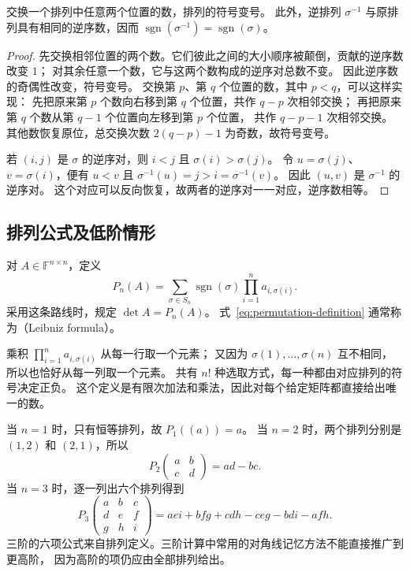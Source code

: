 \documentclass[UTF8,12pt,a4paper,fontset=fandol]{ctexart}
\begin{document}
\begin{lemma}[排列符号的两个事实]
\label{lem:permutation-sign}
交换一个排列中任意两个位置的数，排列的符号变号。
此外，逆排列 $\sigma^{-1}$ 与原排列具有相同的逆序数，因而
$\operatorname{sgn}(\sigma^{-1})=\operatorname{sgn}(\sigma)$。
\end{lemma}

\begin{proof}
先交换相邻位置的两个数。它们彼此之间的大小顺序被颠倒，贡献的逆序数改变 $1$；
对其余任意一个数，它与这两个数构成的逆序对总数不变。
因此逆序数的奇偶性改变，符号变号。
交换第 $p$、第 $q$ 个位置的数，其中 $p<q$，可以这样实现：
先把原来第 $p$ 个数向右移到第 $q$ 个位置，共作 $q-p$ 次相邻交换；
再把原来第 $q$ 个数从第 $q-1$ 个位置向左移到第 $p$ 个位置，
共作 $q-p-1$ 次相邻交换。
其他数恢复原位，总交换次数 $2(q-p)-1$ 为奇数，故符号变号。

若 $(i,j)$ 是 $\sigma$ 的逆序对，则 $i<j$ 且 $\sigma(i)>\sigma(j)$。
令 $u=\sigma(j)$、$v=\sigma(i)$，便有
$u<v$ 且 $\sigma^{-1}(u)=j>i=\sigma^{-1}(v)$。
因此 $(u,v)$ 是 $\sigma^{-1}$ 的逆序对。
这个对应可以反向恢复，故两者的逆序对一一对应，逆序数相等。
\end{proof}

\subsection{排列公式及低阶情形}

\begin{definition}[排列公式定义]
\label{def:permutation-determinant}
对 $A\in\mathbb F^{n\times n}$，定义
\begin{equation}
  P_n(A)=\sum_{\sigma\in S_n}\operatorname{sgn}(\sigma)
  \prod_{i=1}^{n}a_{i,\sigma(i)}.
  \label{eq:permutation-definition}
\end{equation}
采用这条路线时，规定 $\det A=P_n(A)$。
式~\eqref{eq:permutation-definition} 通常称为（Leibniz formula）。
\end{definition}

乘积 $\prod_{i=1}^{n}a_{i,\sigma(i)}$ 从每一行取一个元素；
又因为 $\sigma(1),\ldots,\sigma(n)$ 互不相同，所以也恰好从每一列取一个元素。
共有 $n!$ 种选取方式，每一种都由对应排列的符号决定正负。
这个定义是有限次加法和乘法，因此对每个给定矩阵都直接给出唯一的数。

当 $n=1$ 时，只有恒等排列，故 $P_1((a))=a$。
当 $n=2$ 时，两个排列分别是 $(1,2)$ 和 $(2,1)$，所以
\begin{equation}
  P_2\!\begin{pmatrix}a&b\\c&d\end{pmatrix}=ad-bc.
  \label{eq:two-by-two}
\end{equation}
当 $n=3$ 时，逐一列出六个排列得到
\[
  P_3\!\begin{pmatrix}a&b&c\\d&e&f\\g&h&i\end{pmatrix}
  =aei+bfg+cdh-ceg-bdi-afh.
\]
三阶的六项公式来自排列定义。三阶计算中常用的对角线记忆方法不能直接推广到更高阶，
因为高阶的项仍应由全部排列给出。
\end{document}
